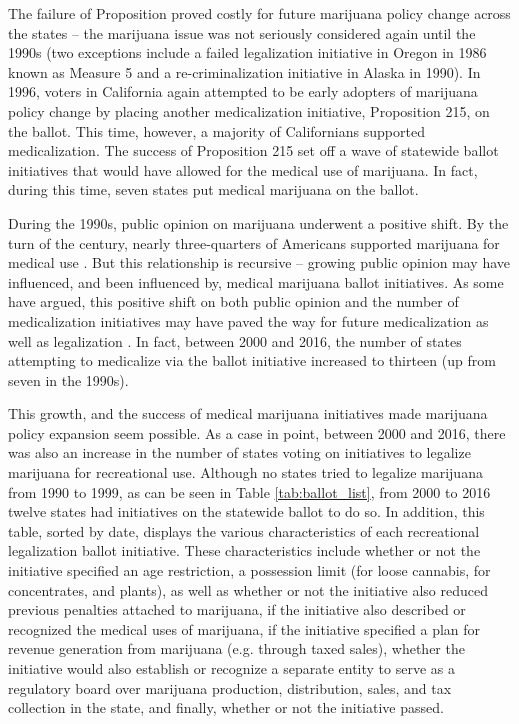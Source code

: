 The failure of Proposition proved costly for future marijuana policy change across the states -- the marijuana issue was not seriously considered again until the 1990s (two exceptions include a failed legalization initiative in Oregon in 1986 known as Measure 5 and a re-criminalization initiative in Alaska in 1990). In 1996, voters in California again attempted to be early adopters of marijuana policy change by placing another medicalization initiative, Proposition 215, on the ballot. This time, however, a majority of Californians supported medicalization. The success of Proposition 215 set off a wave of statewide ballot initiatives that would have allowed for the medical use of marijuana. In fact, during this time, seven states put medical marijuana on the ballot. 



During the 1990s, public opinion on marijuana underwent a positive shift. By the turn of the century, nearly three-quarters of Americans supported marijuana for medical use \citep{gallup_2003,gallup_2001}. But this relationship is recursive -- growing public opinion may have influenced, and been influenced by, medical marijuana ballot initiatives. As some have argued, this positive shift on both public opinion and the number of medicalization initiatives may have paved the way for future medicalization as well as legalization \citep{kilmer_and_maccoun_2017,newhart_and_dolphin_2018,bradford_and_bradford_2017}. In fact, between 2000 and 2016, the number of states attempting to medicalize via the ballot initiative increased to thirteen (up from seven in the 1990s). 

This growth, and the success of medical marijuana initiatives made marijuana policy expansion seem possible. As a case in point, between 2000 and 2016, there was also an increase in the number of states voting on initiatives to legalize marijuana for recreational use. Although no states tried to legalize marijuana from 1990 to 1999, as can be seen in Table \ref{tab:ballot_list}, from 2000 to 2016 twelve states had initiatives on the statewide ballot to do so. In addition, this table, sorted by date, displays the various characteristics of each recreational legalization ballot initiative. These characteristics include whether or not the initiative specified an age restriction, a possession limit (for loose cannabis, for concentrates, and plants), as well as whether or not the initiative also reduced previous penalties attached to marijuana, if the initiative also described or recognized the medical uses of marijuana, if the initiative specified a plan for revenue generation from marijuana (e.g. through taxed sales), whether the initiative would also establish or recognize a separate entity to serve as a regulatory board over marijuana production, distribution, sales, and tax collection in the state, and finally, whether or not the initiative passed. 



